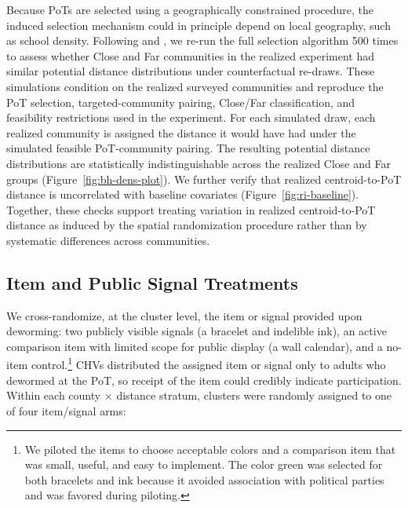 \documentclass[ECM\space ReStud.tex]{subfiles}
\begin{document}
Because PoTs are selected using a geographically constrained procedure, the induced selection mechanism could in principle depend on local geography, such as school density. Following \citet{thorntonDemandImpactLearning2008} and \citet{borusyak2023nonrandom}, we re-run the full selection algorithm 500 times to assess whether Close and Far communities in the realized experiment had similar potential distance distributions under counterfactual re-draws. These simulations condition on the realized surveyed communities and reproduce the PoT selection, targeted-community pairing, Close/Far classification, and feasibility restrictions used in the experiment. For each simulated draw, each realized community is assigned the distance it would have had under the simulated feasible PoT-community pairing. The resulting potential distance distributions are statistically indistinguishable across the realized Close and Far groups (Figure~\ref{fig:bh-dens-plot}). We further verify that realized centroid-to-PoT distance is uncorrelated with baseline covariates (Figure~\ref{fig:ri-baseline}). Together, these checks support treating variation in realized centroid-to-PoT distance as induced by the spatial randomization procedure rather than by systematic differences across communities.


\subsection{Item and Public Signal Treatments}

We cross-randomize, at the cluster level, the item or signal provided upon deworming: two publicly visible signals (a bracelet and indelible ink), an active comparison item with limited scope for public display (a wall calendar), and a no-item control.\footnote{We piloted the items to choose acceptable colors and a comparison item that was small, useful, and easy to implement. The color green was selected for both bracelets and ink because it avoided association with political parties and was favored during piloting.}
CHVs distributed the assigned item or signal only to adults who dewormed at the PoT, so receipt of the item could credibly indicate participation.  Within each county $\times$ distance stratum, clusters were randomly assigned to one of four item/signal arms:
\end{document}
